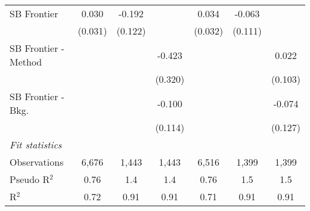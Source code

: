 \begin{tabular}{lcccccc}
   SB Frontier          & 0.030         & -0.192  &              & 0.034        & -0.063  &   \\   
                        & (0.031)       & (0.122) &              & (0.032)      & (0.111) &   \\   
   SB Frontier - Method &               &         & -0.423       &              &         & 0.022\\   
                        &               &         & (0.320)      &              &         & (0.103)\\   
   SB Frontier - Bkg.   &               &         & -0.100       &              &         & -0.074\\   
                        &               &         & (0.114)      &              &         & (0.127)\\   
   \midrule
   \emph{Fit statistics}\\
   Observations         & 6,676         & 1,443   & 1,443        & 6,516        & 1,399   & 1,399\\  
   Pseudo R$^2$         & 0.76          & 1.4     & 1.4          & 0.76         & 1.5     & 1.5\\  
   R$^2$                & 0.72          & 0.91    & 0.91         & 0.71         & 0.91    & 0.91\\  
   

\end{tabular}
